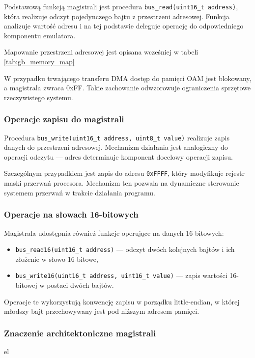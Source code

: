 \documentclass{article}
\begin{document}
Podstawową funkcją magistrali jest procedura \texttt{bus\_read(uint16\_t address)}, która realizuje odczyt pojedynczego bajtu z przestrzeni adresowej. Funkcja analizuje wartość adresu i na tej podstawie deleguje operację do odpowiedniego komponentu emulatora.

Mapowanie przestrzeni adresowej jest opisana wcześniej w tabeli \ref{tab:gb_memory_map}

W przypadku trwającego transferu DMA dostęp do pamięci OAM jest blokowany, a magistrala zwraca 0xFF. Takie zachowanie odwzorowuje ograniczenia sprzętowe rzeczywistego systemu.

\subsubsection{Operacje zapisu do magistrali}

Procedura \texttt{bus\_write(uint16\_t address, uint8\_t value)} realizuje zapis danych do przestrzeni adresowej. Mechanizm działania jest analogiczny do operacji odczytu — adres determinuje komponent docelowy operacji zapisu.

Szczególnym przypadkiem jest zapis do adresu \texttt{0xFFFF}, który modyfikuje rejestr maski przerwań procesora. Mechanizm ten pozwala na dynamiczne sterowanie systemem przerwań w trakcie działania programu.

\subsubsection{Operacje na słowach 16-bitowych}

Magistrala udostępnia również funkcje operujące na danych 16-bitowych:
\begin{itemize}
	\item \texttt{bus\_read16(uint16\_t address)} — odczyt dwóch kolejnych bajtów i ich złożenie w słowo 16-bitowe,
	\item \texttt{bus\_write16(uint16\_t address, uint16\_t value)} — zapis wartości 16-bitowej w postaci dwóch bajtów.
\end{itemize}

Operacje te wykorzystują konwencję zapisu w porządku little-endian, w której młodszy bajt przechowywany jest pod niższym adresem pamięci.

\subsubsection{Znaczenie architektoniczne magistrali}el
\end{document}
